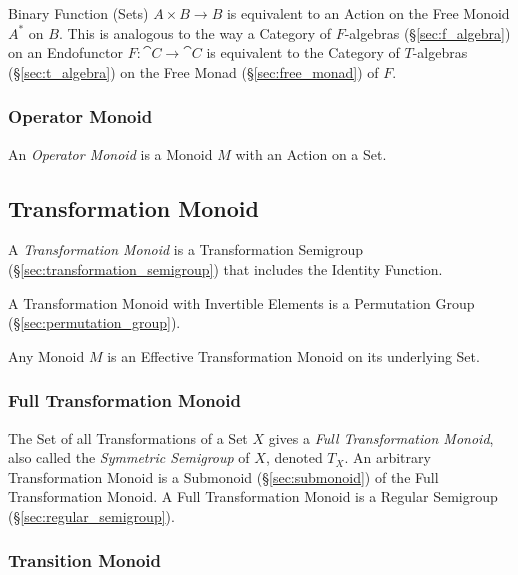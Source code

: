 Binary Function (Sets) $A \times B \rightarrow B$ is equivalent to an
Action on the Free Monoid $A^*$ on $B$. This is analogous to the way a
Category of $F$-algebras (\S\ref{sec:f_algebra}) on an Endofunctor $F
: \cat{C} \rightarrow \cat{C}$ is equivalent to the Category of
$T$-algebras (\S\ref{sec:t_algebra}) on the Free Monad
(\S\ref{sec:free_monad}) of $F$.



\subsubsection{Operator Monoid}\label{sec:operator_monoid}

An \emph{Operator Monoid} is a Monoid $M$ with an Action on a Set.



\subsection{Transformation Monoid}\label{sec:transformation_monoid}

A \emph{Transformation Monoid} is a Transformation Semigroup
(\S\ref{sec:transformation_semigroup}) that includes the Identity
Function.

A Transformation Monoid with Invertible Elements is a Permutation
Group (\S\ref{sec:permutation_group}).

Any Monoid $M$ is an Effective Transformation Monoid on its underlying
Set.



\subsubsection{Full Transformation Monoid}\label{sec:full_transformation}

The Set of all Transformations of a Set $X$ gives a \emph{Full
  Transformation Monoid}, also called the \emph{Symmetric Semigroup}
of $X$, denoted $T_X$. An arbitrary Transformation Monoid is a
Submonoid (\S\ref{sec:submonoid}) of the Full Transformation Monoid. A
Full Transformation Monoid is a Regular Semigroup
(\S\ref{sec:regular_semigroup}).



\subsubsection{Transition Monoid}\label{sec:transition_monoid}

